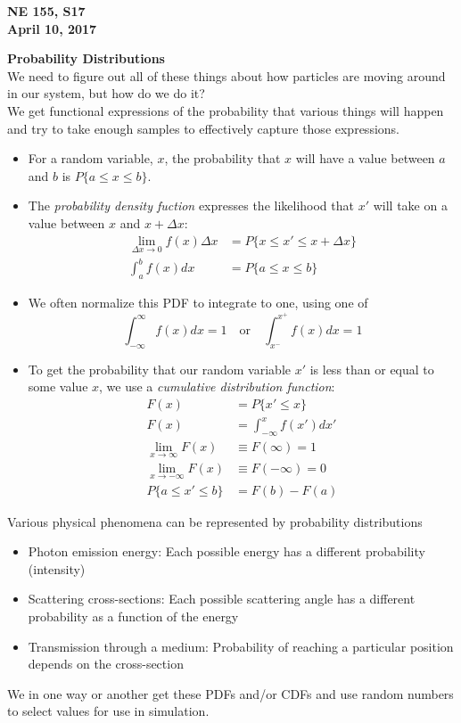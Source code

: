 \documentclass[12pt]{article}
\begin{document}
\begin{center}
{\bf NE 155, S17\\
April 10, 2017
}
\end{center}


\textbf{Probability Distributions}\\
We need to figure out all of these things about how particles are moving around in our system, but how do we do it?\\
We get functional expressions of the probability that various things will happen and try to take enough samples to effectively capture those expressions.
%
\begin{itemize}
\item For a random variable, $x$, the probability that $x$ will have a value between $a$ and $b$ is $P\{a \leq x \leq b\}$.
%
\item The \textit{probability density fuction} expresses the likelihood that $x'$ will take on a value between $x$ and $x+\Delta x$:
\begin{align*}
\lim_{\Delta x \to 0} f(x)\Delta x &= P \{ x \leq x' \leq x + \Delta x \}\\
\int_a^b f(x) dx &= P\{a \leq x \leq b\}
\end{align*}
%
\item We often normalize this PDF to integrate to one, using one of
\begin{equation}
\int_{-\infty}^{\infty} f(x) dx = 1 \quad \text{or} \quad
\int_{x^-}^{x^+} f(x) dx = 1 \nonumber
\end{equation}
%
\item To get the probability that our random variable $x'$ is less than or equal to some value $x$, we use a \textit{cumulative distribution function}:
\begin{align*}
F(x) &= P\{x' \leq x\} \\
F(x) &= \int_{-\infty}^{x} f(x') dx' \\
\lim_{x \to \infty} F(x) &\equiv F(\infty) = 1 \\
\lim_{x \to -\infty} F(x) &\equiv F(-\infty) = 0 \\
P \{ a \leq x' \leq b \} &= F(b) - F(a)
\end{align*}
\end{itemize}

Various physical phenomena can be represented by probability distributions
\begin{itemize}
  \item Photon emission energy: Each possible energy has a different probability (intensity)
  \item Scattering cross-sections: Each possible scattering angle has a different probability as a function of the energy
  \item Transmission through a medium: Probability of reaching a particular position
depends on the cross-section
\end{itemize}
%
We in one way or another get these PDFs and/or CDFs and use random numbers to select values for use in simulation.
\end{document}
